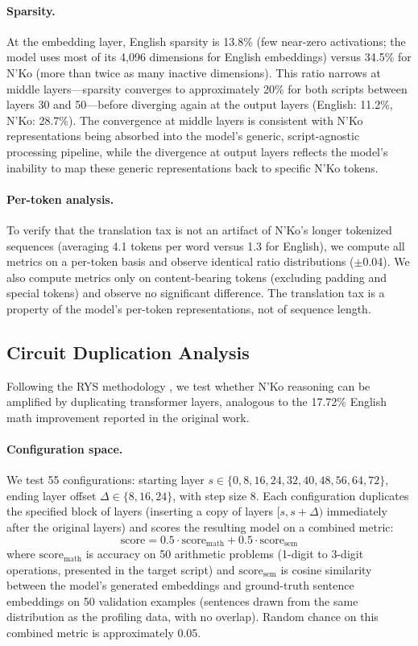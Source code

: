 \documentclass[11pt]{article}
\begin{document}
\paragraph{Sparsity.}
At the embedding layer, English sparsity is 13.8\% (few near-zero activations; the model uses most of its 4,096 dimensions for English embeddings) versus 34.5\% for N'Ko (more than twice as many inactive dimensions).
This ratio narrows at middle layers---sparsity converges to approximately 20\% for both scripts between layers 30 and 50---before diverging again at the output layers (English: 11.2\%, N'Ko: 28.7\%).
The convergence at middle layers is consistent with N'Ko representations being absorbed into the model's generic, script-agnostic processing pipeline, while the divergence at output layers reflects the model's inability to map these generic representations back to specific N'Ko tokens.

\paragraph{Per-token analysis.}
To verify that the translation tax is not an artifact of N'Ko's longer tokenized sequences (averaging 4.1 tokens per word versus 1.3 for English), we compute all metrics on a per-token basis and observe identical ratio distributions ($\pm$0.04).
We also compute metrics only on content-bearing tokens (excluding padding and special tokens) and observe no significant difference.
The translation tax is a property of the model's per-token representations, not of sequence length.

\subsection{Circuit Duplication Analysis}
\label{sec:circuit-dup}

Following the RYS methodology \cite{ng2024rys}, we test whether N'Ko reasoning can be amplified by duplicating transformer layers, analogous to the 17.72\% English math improvement reported in the original work.

\paragraph{Configuration space.}
We test 55 configurations: starting layer $s \in \{0, 8, 16, 24, 32, 40, 48, 56, 64, 72\}$, ending layer offset $\Delta \in \{8, 16, 24\}$, with step size 8.
Each configuration duplicates the specified block of layers (inserting a copy of layers $[s, s+\Delta)$ immediately after the original layers) and scores the resulting model on a combined metric:
\begin{equation}
\text{score} = 0.5 \cdot \text{score}_\text{math} + 0.5 \cdot \text{score}_\text{sem}
\end{equation}
where $\text{score}_\text{math}$ is accuracy on 50 arithmetic problems (1-digit to 3-digit operations, presented in the target script) and $\text{score}_\text{sem}$ is cosine similarity between the model's generated embeddings and ground-truth sentence embeddings on 50 validation examples (sentences drawn from the same distribution as the profiling data, with no overlap).
Random chance on this combined metric is approximately 0.05.
\end{document}
